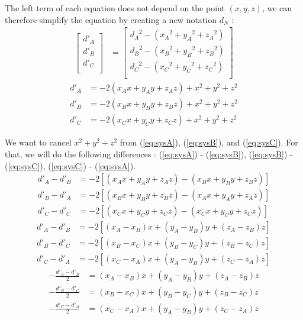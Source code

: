 \documentclass[preview,border=12pt]{standalone}
\begin{document}
The left term of each equation does not depend on the point \(\left(x, y, z\right)\), we can therefore simplify the equation by creating a new notation \(d_N\) :
\begin{align*}
    \begin{bmatrix}
        d'_A \\
        d'_B \\
        d'_C \\
    \end{bmatrix} & =
    \begin{bmatrix}
        {d_A}^2 - \left({x_A}^2 + {y_A}^2 + {z_A}^2 \right) \\
        {d_B}^2 - \left({x_B}^2 + {y_B}^2 + {z_B}^2 \right) \\
        {d_C}^2 - \left({x_C}^2 + {y_C}^2 + {z_C}^2 \right) \\
    \end{bmatrix}
\end{align*}
\begin{align}
    d'_A & = -2 \left(x_A x + y_A y + z_A z\right) + x^2 + y^2 + z^2 \label{eq:sysA} \\
    d'_B & = -2 \left(x_B x + y_B y + z_B z\right) + x^2 + y^2 + z^2 \label{eq:sysB} \\
    d'_C & = -2 \left(x_C x + y_C y + z_C z\right) + x^2 + y^2 + z^2 \label{eq:sysC}
\end{align}

We want to cancel \(x^2 + y^2 + z^2\) from (\ref{eq:sysA}), (\ref{eq:sysB}), and (\ref{eq:sysC}). For that, we will do the following differences : (\ref{eq:sysA}) - (\ref{eq:sysB}), (\ref{eq:sysB}) - (\ref{eq:sysC}), (\ref{eq:sysC}) - (\ref{eq:sysA}).
\begin{align*}
    d'_A - d'_B & = -2 \left[\left(x_A x + y_A y + z_A z\right) - \left(x_B x + y_B y + z_B z\right)\right] \\
    d'_B - d'_A & = -2 \left[\left(x_B x + y_B y + z_B z\right) - \left(x_A x + y_A y + z_A z\right)\right] \\
    d'_C - d'_C & = -2 \left[\left(x_C x + y_C y + z_C z\right) - \left(x_C x + y_C y + z_C z\right)\right]
\end{align*}
\begin{align*}
    d'_A - d'_B & = -2 \left[\left(x_A - x_B\right)x + \left(y_A - y_B\right)y + \left(z_A - z_B\right)z\right] \\
    d'_B - d'_C & = -2 \left[\left(x_B - x_C\right)x + \left(y_B - y_C\right)y + \left(z_B - z_C\right)z\right] \\
    d'_C - d'_A & = -2 \left[\left(x_C - x_A\right)x + \left(y_A - y_B\right)y + \left(z_C - z_A\right)z\right]
\end{align*}
\begin{align*}
    - \frac{d'_A - d'_B}{2} & = \left(x_A - x_B\right)x + \left(y_A - y_B\right)y + \left(z_A - z_B\right)z \\
    - \frac{d'_B - d'_C}{2} & = \left(x_B - x_C\right)x + \left(y_B - y_C\right)y + \left(z_B - z_C\right)z \\
    - \frac{d'_C - d'_A}{2} & = \left(x_C - x_A\right)x + \left(y_A - y_B\right)y + \left(z_C - z_A\right)z
\end{align*}
\end{document}
